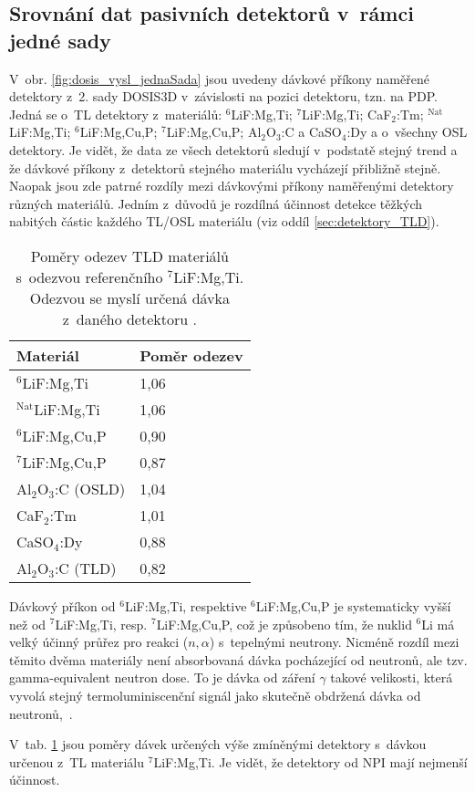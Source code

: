 \subsection{Srovnání dat pasivních detektorů v~rámci jedné sady}
V~obr. \ref{fig:dosis_vysl_jednaSada} jsou uvedeny dávkové příkony naměřené detektory z~2. sady DOSIS3D v~závislosti na pozici detektoru, tzn. na PDP. Jedná se o~TL detektory z~materiálů: $^6$LiF:Mg,Ti; $^7$LiF:Mg,Ti; CaF$_2$:Tm; $^{\text{Nat}}$LiF:Mg,Ti; $^6$LiF:Mg,Cu,P; $^7$LiF:Mg,Cu,P; Al$_2$O$_3$:C a CaSO$_4$:Dy a o~všechny OSL detektory. Je vidět, že data ze všech detektorů sledují v~podstatě stejný trend a že dávkové příkony z~detektorů stejného materiálu vycházejí přibližně stejně. Naopak jsou zde patrné rozdíly mezi dávkovými příkony naměřenými detektory různých materiálů. Jedním z~důvodů je rozdílná účinnost detekce těžkých nabitých částic každého TL/OSL materiálu (viz oddíl \ref{sec:detektory_TLD}).
\begin{table}[H]
  \centering
  \caption{Poměry odezev TLD materiálů s~odezvou referenčního $^7$LiF:Mg,Ti. Odezvou se myslí určená dávka z~daného detektoru \cite{dosis}.}
  \label{tab:dosis_TLD_ratio}
  \begin{tabular}{ll}
	\toprule
	Materiál & Poměr odezev\\
	\midrule
$^6$LiF:Mg,Ti		&1,06\\
$^{\text{Nat}}$LiF:Mg,Ti	&1,06\\
$^6$LiF:Mg,Cu,P		&0,90\\
$^7$LiF:Mg,Cu,P		&0,87\\
Al$_2$O$_3$:C (OSLD)&1,04\\ 
CaF$_2$:Tm			&1,01\\
CaSO$_4$:Dy			&0,88\\
Al$_2$O$_3$:C (TLD)	&0,82\\
\bottomrule
  \end{tabular}
\end{table}

Dávkový příkon od $^6$LiF:Mg,Ti, respektive $^6$LiF:Mg,Cu,P je systematicky vyšší než od $^7$LiF:Mg,Ti, resp. $^7$LiF:Mg,Cu,P, což je způsobeno tím, že nuklid $^6$Li má velký účinný průřez pro reakci ($n,\alpha$) s~tepelnými neutrony. Nicméně rozdíl mezi těmito dvěma materiály není absorbovaná dávka pocházející od neutronů, ale tzv. gamma-equivalent neutron dose. To je dávka od záření $\gamma$ takové velikosti, která vyvolá stejný termoluminiscenční signál jako skutečně obdržená dávka od neutronů,~\cite{dosis}.

V~tab. \ref{tab:dosis_TLD_ratio} jsou poměry dávek určených výše zmíněnými detektory s~dávkou určenou z~TL materiálu $^7$LiF:Mg,Ti. Je vidět, že detektory od NPI mají nejmenší účinnost.

